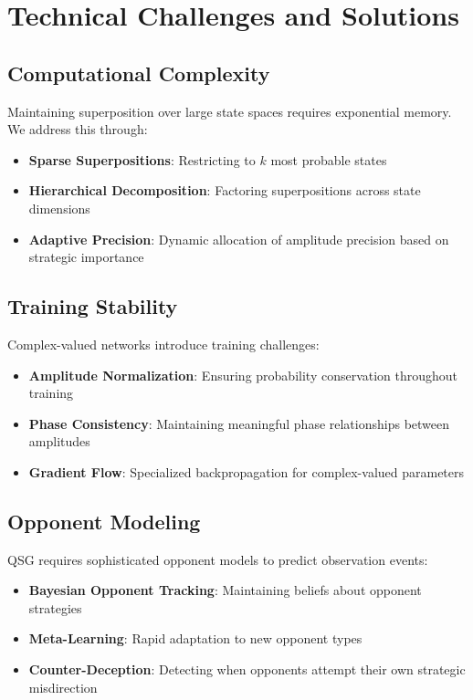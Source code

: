 \documentclass[11pt,a4paper]{article}
\begin{document}
\section{Technical Challenges and Solutions}

\subsection{Computational Complexity}

Maintaining superposition over large state spaces requires exponential memory. We address this through:

\begin{itemize}
\item \textbf{Sparse Superpositions}: Restricting to $k$ most probable states
\item \textbf{Hierarchical Decomposition}: Factoring superpositions across state dimensions
\item \textbf{Adaptive Precision}: Dynamic allocation of amplitude precision based on strategic importance
\end{itemize}

\subsection{Training Stability}

Complex-valued networks introduce training challenges:

\begin{itemize}
\item \textbf{Amplitude Normalization}: Ensuring probability conservation throughout training
\item \textbf{Phase Consistency}: Maintaining meaningful phase relationships between amplitudes
\item \textbf{Gradient Flow}: Specialized backpropagation for complex-valued parameters
\end{itemize}

\subsection{Opponent Modeling}

QSG requires sophisticated opponent models to predict observation events:

\begin{itemize}
\item \textbf{Bayesian Opponent Tracking}: Maintaining beliefs about opponent strategies
\item \textbf{Meta-Learning}: Rapid adaptation to new opponent types
\item \textbf{Counter-Deception}: Detecting when opponents attempt their own strategic misdirection
\end{itemize}
\end{document}
